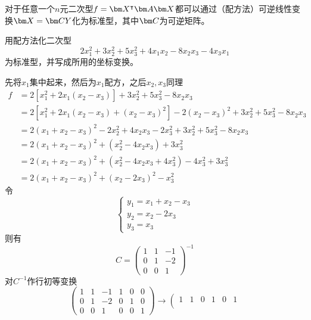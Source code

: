 \begin{theorem}
    对于任意一个$n$元二次型$f=\mat{X}^\intercal \mat{A} \mat{X}$都可以通过（配方法）可逆线性变换$\mat{X}=\mat{CY}$化为标准型，其中$\mat{C}$为可逆矩阵。
\end{theorem}
\begin{example}
    用配方法化二次型
    \[ 2x_1^2 + 3x_2^2 + 5x_3^2 + 4x_1x_2 - 8x_2x_3 - 4x_3x_1 \]
    为标准型，并写成所用的坐标变换。
\end{example}
\begin{solution}
    先将$x_1$集中起来，然后为$x_1$配方，之后$x_2,x_3$同理
    \begin{align*}
        f & = 2[x_1^2 + 2x_1(x_2-x_3)] + 3x_2^2 + 5x_3^2 -8x_2x_3                              \\
          & = 2[x_1^2 + 2x_1(x_2-x_3) + (x_2-x_3)^2] - 2(x_2-x_3)^2 + 3x_2^2 + 5x_3^2 -8x_2x_3 \\
          & = 2(x_1+x_2-x_3)^2 - 2x_2^2 + 4x_2x_3 - 2x_3^2 + 3x_2^2 + 5x_3^2 -8x_2x_3          \\
          & = 2(x_1+x_2-x_3)^2 + (x_2^2-4x_2x_3) + 3x_3^2                                      \\
          & = 2(x_1+x_2-x_3)^2 + (x_2^2-4x_2x_3 +4x_3^2) - 4x_3^2 + 3x_3^2                     \\
          & = 2(x_1+x_2-x_3)^2 + (x_2-2x_3)^2 - x_3^2
    \end{align*}
    令
    \[
        \begin{cases}
            y_1 = x_1+x_2-x_3 \\
            y_2 = x_2-2x_3    \\
            y_3 = x_3
        \end{cases}
    \]
    则有
    \[
        C  =
        \begin{pmatrix}
            1 & 1 & -1 \\
            0 & 1 & -2 \\
            0 & 0 & 1
        \end{pmatrix}^{-1}
    \]
    对$C^{-1}$作行初等变换
    \[
        \left(\begin{array}{ccc|ccc}
                1 & 1 & -1 & 1 & 0 & 0 \\
                0 & 1 & -2 & 0 & 1 & 0 \\
                0 & 0 & 1  & 0 & 0 & 1
            \end{array}\right)
        \longrightarrow
        \left(\begin{array}{ccc|ccc}
                1 & 1 & 0 & 1 & 0 & 1 \\

\end{array}\]
\end{solution}
